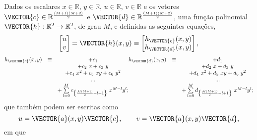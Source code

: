 \begin{myproofT}\label{proof:theo:maphxr2r2}
Dados
os escalares $x \in \mathbb{R}$, $y \in \mathbb{R}$, $u \in \mathbb{R}$, $v \in \mathbb{R}$ e 
os vetores $\VECTOR{c} \in \mathbb{R}^{\frac{(M+1)(M+2)}{2}}$ e $\VECTOR{d} \in \mathbb{R}^{\frac{(M+1)(M+2)}{2}}$,
uma função polinomial $\VECTOR{h}:\mathbb{R}^2 \rightarrow \mathbb{R}^2$, de grau $M$, e 
definidas as seguintes equações,
\begin{equation}\label{eq:proof:theo:maphxr2r2:0}
\begin{bmatrix}
u\\
v
\end{bmatrix}=
\VECTOR{h}(x,y)\equiv
\begin{bmatrix}
h_{\VECTOR{c}}(x,y)\\
h_{\VECTOR{d}}(x,y)
\end{bmatrix},
\end{equation}
\begin{equation}\label{eq:proof:theo:maphxr2r2:1}
\begin{matrix}
h_{\VECTOR{c}}(x,y) & \equiv & +c_{1}\\
              ~ & ~ & +c_{2}~x + c_{3}~y\\
              ~ & ~ & +c_{4}~x^2 +c_{5}~xy + c_{6}~y^2\\
              ~ & ~ &  ...\\
              ~ & ~ & +\sum \limits_{l=0}^{M}c_{\left\{ \frac{M(M+1)}{2}+l+1\right\}}~x^{M-l}y^{l};
\end{matrix}
\begin{matrix}
h_{\VECTOR{d}}(x,y) & \equiv & +d_{1}\\
              ~ & ~ & +d_{2}~x + d_{3}~y\\
              ~ & ~ & +d_{4}~x^2 +d_{5}~xy + d_{6}~y^2\\
              ~ & ~ &  ...\\
              ~ & ~ & +\sum \limits_{l=0}^{M}d_{\left\{ \frac{M(M+1)}{2}+l+1\right\}}~x^{M-l}y^{l};
\end{matrix}  
\end{equation}
que também podem ser escritas como
\begin{equation}
u=\VECTOR{a}(x,y)\VECTOR{c},
\qquad
v=\VECTOR{a}(x,y)\VECTOR{d},
\end{equation}
em que 

\end{myproofT}
